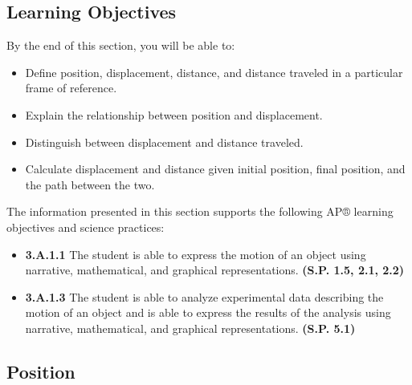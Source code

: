 \documentclass[
]{book}
\providecommand{\tightlist}{%
  \setlength{\itemsep}{0pt}\setlength{\parskip}{0pt}}
\newenvironment{learning-objectives}{}{}
\begin{document}
\hypertarget{fs-id3277370}{}
\begin{learning-objectives}

\hypertarget{learning-objectives}{%
\subsection{Learning Objectives}\label{learning-objectives}}

By the end of this section, you will be able to:

\begin{itemize}
\tightlist
\item
  Define position, displacement, distance, and distance traveled in a
  particular frame of reference.
\item
  Explain the relationship between position and displacement.
\item
  Distinguish between displacement and distance traveled.
\item
  Calculate displacement and distance given initial position, final
  position, and the path between the two.
\end{itemize}

The information presented in this section supports the following AP®
learning objectives and science practices:

\begin{itemize}
\tightlist
\item
  \textbf{3.A.1.1} The student is able to express the motion of an object
  using narrative, mathematical, and graphical representations.
  \textbf{(S.P. 1.5, 2.1, 2.2)}
\item
  \textbf{3.A.1.3} The student is able to analyze experimental data
  describing the motion of an object and is able to express the
  results of the analysis using narrative, mathematical, and graphical
  representations. \textbf{(S.P. 5.1)}
\end{itemize}

\end{learning-objectives}

\hypertarget{fs-id3178358}{}
\hypertarget{position}{%
\subsection{Position}\label{position}}
\end{document}
